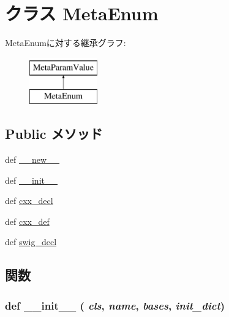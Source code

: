 \hypertarget{classm5_1_1params_1_1MetaEnum}{
\section{クラス MetaEnum}
\label{classm5_1_1params_1_1MetaEnum}
}
MetaEnumに対する継承グラフ:\begin{figure}[H]
\begin{center}
\leavevmode
\includegraphics[height=2cm]{classm5_1_1params_1_1MetaEnum}
\end{center}
\end{figure}
\subsection*{Public メソッド}
\begin{DoxyCompactItemize}
\item 
def \hyperlink{classm5_1_1params_1_1MetaEnum_a2f15a4676204349e06bcced484b06b70}{\_\-\_\-new\_\-\_\-}
\item 
def \hyperlink{classm5_1_1params_1_1MetaEnum_ac775ee34451fdfa742b318538164070e}{\_\-\_\-init\_\-\_\-}
\item 
def \hyperlink{classm5_1_1params_1_1MetaEnum_a723cbb1dc9ae0e7f3d102c6678f181c0}{cxx\_\-decl}
\item 
def \hyperlink{classm5_1_1params_1_1MetaEnum_a52673dd9e1546665069ec8891e00eeb8}{cxx\_\-def}
\item 
def \hyperlink{classm5_1_1params_1_1MetaEnum_a83526365333b680bfcbd9b037527cc25}{swig\_\-decl}
\end{DoxyCompactItemize}


\subsection{関数}
\hypertarget{classm5_1_1params_1_1MetaEnum_ac775ee34451fdfa742b318538164070e}{
\subsubsection[{\_\-\_\-init\_\-\_\-}]{\setlength{\rightskip}{0pt plus 5cm}def \_\-\_\-init\_\-\_\- ( {\em cls}, \/   {\em name}, \/   {\em bases}, \/   {\em init\_\-dict})}}
\label{classm5_1_1params_1_1MetaEnum_ac775ee34451fdfa742b318538164070e}




